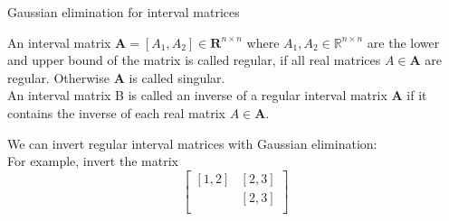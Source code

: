 \documentclass[german,10pt,xcolor=colortbl,compress]{beamer}
\begin{document}
\begin{frame}{Gaussian elimination for interval matrices}
    \begin{definition}
    An interval matrix $\mathbf{A}=[A_1,A_2] \in \mathbf{R}^{n \times n} $ where $A_1, A_2 \in \mathbb{R}^{n\times n}$ are the lower and upper bound of the matrix is called regular, if all real matrices $A \in \mathbf{A}$ are regular. Otherwise $\mathbf{A} $ is called singular.\\
    An interval matrix B is called an inverse of a regular interval matrix $\mathbf{A} $ if it contains the inverse of each real matrix $A \in \mathbf{A}$.

    \end{definition}
    \pause
    We can invert regular interval matrices with Gaussian elimination:\\
    For example, invert the matrix
    \[
    \left[
    \begin{array}{cc}
    [1,2]&[2,3] \\

    [0,0]&[2,3]\\
    \end{array}
    \right]
    \]

\end{frame}
\end{document}
